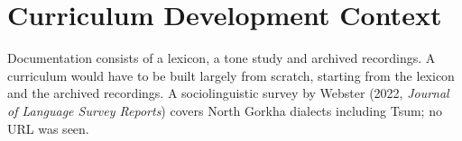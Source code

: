 \documentclass[12pt]{article}
\begin{document}
\section{Curriculum Development Context}
Documentation consists of a lexicon, a tone study and archived recordings. A curriculum would have to be built largely from scratch, starting from the lexicon and the archived recordings. A sociolinguistic survey by Webster (2022, \emph{Journal of Language Survey Reports}) covers North Gorkha dialects including Tsum; no URL was seen.
\end{document}
